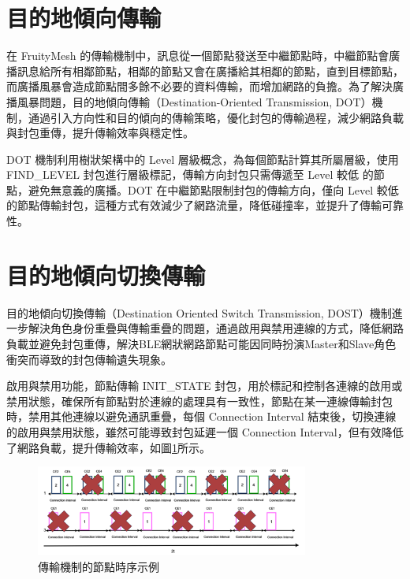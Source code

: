 \begin{ZhChapter}
\section{目的地傾向傳輸}

在 FruityMesh 的傳輸機制中，訊息從一個節點發送至中繼節點時，中繼節點會廣播訊息給所有相鄰節點，相鄰的節點又會在廣播給其相鄰的節點，直到目標節點，而廣播風暴會造成節點間多餘不必要的資料傳輸，而增加網路的負擔。為了解決廣播風暴問題，目的地傾向傳輸（Destination-Oriented Transmission, DOT）\cite{112TIT00392032}機制，通過引入方向性和目的傾向的傳輸策略，優化封包的傳輸過程，減少網路負載與封包重傳，提升傳輸效率與穩定性。

DOT 機制利用樹狀架構中的 Level 層級概念，為每個節點計算其所屬層級，使用 FIND\_LEVEL 封包進行層級標記，傳輸方向封包只需傳遞至 Level 較低 的節點，避免無意義的廣播。DOT 在中繼節點限制封包的傳輸方向，僅向 Level 較低的節點傳輸封包，這種方式有效減少了網路流量，降低碰撞率，並提升了傳輸可靠性。

\section{目的地傾向切換傳輸}

目的地傾向切換傳輸（Destination Oriented Switch Transmission, DOST）\cite{112TIT00392032}機制進一步解決角色身份重疊與傳輸重疊的問題，通過啟用與禁用連線的方式，降低網路負載並避免封包重傳，解決BLE網狀網路節點可能因同時扮演Master和Slave角色衝突而導致的封包傳輸遺失現象。

啟用與禁用功能，節點傳輸 INIT\_STATE 封包，用於標記和控制各連線的啟用或禁用狀態，確保所有節點對於連線的處理具有一致性，節點在某一連線傳輸封包時，禁用其他連線以避免通訊重疊，每個 Connection Interval 結束後，切換連線的啟用與禁用狀態，雖然可能導致封包延遲一個 Connection Interval，但有效降低了網路負載，提升傳輸效率，如圖\ref{fig: 傳輸機制的節點時序示例}所示。

\begin{figure}[H]
    \centering
    \includegraphics[width = 0.8\textwidth]{image/傳輸機制的節點時序示例.png}
    \caption{傳輸機制的節點時序示例\cite{112TIT00392032}}
    \label{fig: 傳輸機制的節點時序示例}
\end{figure}


\end{ZhChapter}
